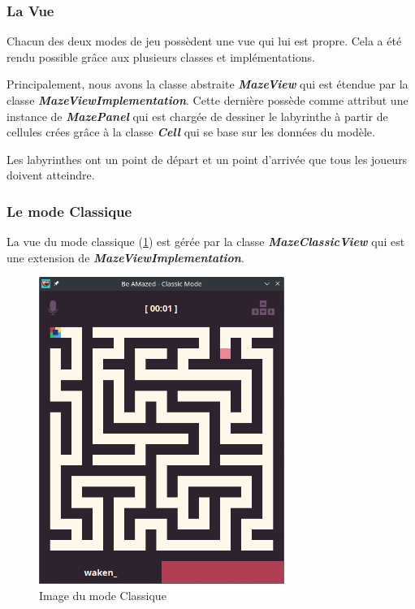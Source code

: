 \subsubsection{La Vue}
\label{subsubsec:vue}

Chacun des deux modes de jeu possèdent une vue qui lui est propre.
Cela a été rendu possible grâce aux plusieurs classes et implémentations.

Principalement, nous avons la classe abstraite \textbf{\textit{MazeView}} qui est étendue par la classe \textbf{\textit{MazeViewImplementation}}.
Cette dernière possède comme attribut une instance de
\textbf{\textit{MazePanel}} qui est chargée de dessiner le labyrinthe à partir de cellules crées grâce à la classe \textbf{\textit{Cell}} qui se base sur les données du modèle.

Les labyrinthes ont un point de départ et un point d'arrivée que tous les joueurs doivent atteindre.
\subsubsection*{Le mode Classique}

La vue du mode classique (\ref{fig:ClassicModeLabyrinth}) est gérée par la classe \textbf{\textit{MazeClassicView}} qui est une extension de \textbf{\textit{MazeViewImplementation}}.

\begin{figure}[!htb]%
    \centering
    \includegraphics[width=8cm]{ressources/Implementation/Labyrinthe/Vue/Classic/Classic.png}%
    \caption{Image du mode Classique}%
    \label{fig:ClassicModeLabyrinth}
\end{figure}
